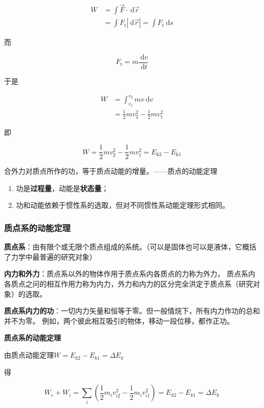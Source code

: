 \documentclass[
	12pt, %
	a4paper, %
]{myLegrandOrangeBook}
\begin{document}
$$
\begin{aligned}
    W & =\int \overrightarrow{F} \cdot \mathrm{~d} \overrightarrow{r} \\
    & =\int F_{\mathrm{t}}|\mathrm{~d} \overrightarrow{r}|=\int F_{\mathrm{t}} \mathrm{~d} s
\end{aligned}
$$

而

$$
    F_{\mathrm{t}}=m \frac{\mathrm{~d} v}{\mathrm{~d} t}
$$

于是

$$
    \begin{aligned}
    W & =\int_{v_1}^{v_2} m v \mathrm{~d} v \\
    & =\frac{1}{2} m v_2^2-\frac{1}{2} m v_1^2
    \end{aligned}
$$

即

\begin{equation}
    W=\frac{1}{2} m v_2^2-\frac{1}{2} m v_1^2=E_{\mathrm{k} 2}-E_{\mathrm{k} 1}
\end{equation}

合外力对质点所作的功，等于质点动能的增量。——质点的动能定理

\begin{enumerate}
    \item 功是\textbf{过程量}，动能是\textbf{状态量}；
    \item 功和动能依赖于惯性系的选取，但对不同惯性系动能定理形式相同。
\end{enumerate}

\subsubsection*{质点系的动能定理}

\textbf{质点系}：由有限个或无限个质点组成的系统。（可以是固体也可以是液体，它概括了力学中最普遍的研究对象）

\textbf{内力和外力}：质点系以外的物体作用于质点系内各质点的力称为外力，
质点系内各质点之问的相互作用力称为内力，外力和内力的区分完全洪定于质点系（研究对象）的选取。

\textbf{质点系内力的功}：一切内力矢量和恒等于零。但一般情烷下，所有内力作功的总和并不为零。
例如，两个彼此相互吸引的物体，移动一段位移，都作正功。

\textbf{质点系的动能定理}

由质点动能定理$W=E_{k 2}-E_{k 1}=\Delta E_k$

得

\begin{equation}
    W_e+W_i=\sum_i\left(\frac{1}{2} m_i v_{i 2}^2-\frac{1}{2} m_i v_{i 1}^2\right)=E_{k 2}-E_{k 1}=\Delta E_k
\end{equation}
\end{document}
